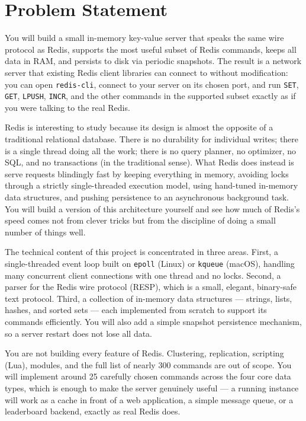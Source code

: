 \documentclass[11pt,a4paper]{article}
\begin{document}

\section{Problem Statement}

You will build a small in-memory key-value server that speaks the same wire protocol as Redis, supports the most useful subset of Redis commands, keeps all data in RAM, and persists to disk via periodic snapshots. The result is a network server that existing Redis client libraries can connect to without modification: you can open \texttt{redis-cli}, connect to your server on its chosen port, and run \texttt{SET}, \texttt{GET}, \texttt{LPUSH}, \texttt{INCR}, and the other commands in the supported subset exactly as if you were talking to the real Redis.

Redis is interesting to study because its design is almost the opposite of a traditional relational database. There is no durability for individual writes; there is a single thread doing all the work; there is no query planner, no optimizer, no SQL, and no transactions (in the traditional sense). What Redis does instead is serve requests blindingly fast by keeping everything in memory, avoiding locks through a strictly single-threaded execution model, using hand-tuned in-memory data structures, and pushing persistence to an asynchronous background task. You will build a version of this architecture yourself and see how much of Redis's speed comes not from clever tricks but from the discipline of doing a small number of things well.

The technical content of this project is concentrated in three areas. First, a single-threaded event loop built on \texttt{epoll} (Linux) or \texttt{kqueue} (macOS), handling many concurrent client connections with one thread and no locks. Second, a parser for the Redis wire protocol (RESP), which is a small, elegant, binary-safe text protocol. Third, a collection of in-memory data structures --- strings, lists, hashes, and sorted sets --- each implemented from scratch to support its commands efficiently. You will also add a simple snapshot persistence mechanism, so a server restart does not lose all data.

You are not building every feature of Redis. Clustering, replication, scripting (Lua), modules, and the full list of nearly 300 commands are out of scope. You will implement around 25 carefully chosen commands across the four core data types, which is enough to make the server genuinely useful --- a running instance will work as a cache in front of a web application, a simple message queue, or a leaderboard backend, exactly as real Redis does.
\end{document}
